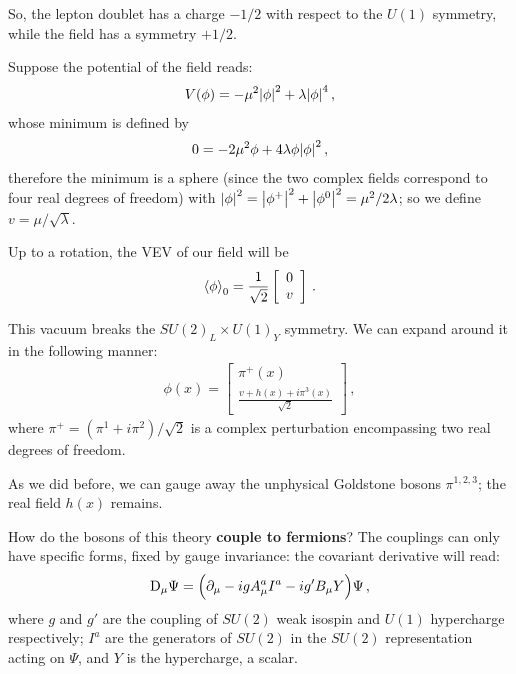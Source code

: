 \documentclass[main.tex]{subfiles}
\begin{document}
So, the lepton doublet has a charge \(-1/2\) with respect to the \(U(1)\) symmetry, while the field has a symmetry \(+1/2\). 

Suppose the potential of the field reads: 
%
\begin{align}
V(\phi ) = - \mu^2 \abs{\phi }^2 + \lambda \abs{\phi }^{4}
\,,
\end{align}
%
whose minimum is defined by 
%
\begin{align}
0= - 2 \mu^2 \phi + 4 \lambda \phi \abs{\phi }^2
\,,
\end{align}
%
therefore the minimum is a sphere (since the two complex fields correspond to four real degrees of freedom) with \(\abs{\phi }^2 =  \abs{\phi^{+}}^2 + \abs{\phi^{0}}^2 = \mu^2 / 2 \lambda \); so we define \(v = \mu / \sqrt{\lambda }\).

Up to a rotation, the VEV of our field will be 
%
\begin{align}
\expval{\phi }_{0} = \frac{1}{\sqrt{2}}
\left[\begin{array}{c}
0 \\ 
v
\end{array}\right]
\,.
\end{align}

This vacuum breaks the \(SU(2)_L \times U(1)_{Y}\) symmetry. 
We can expand around it in the following manner: 
%
\begin{align}
\phi (x) 
= 
\left[\begin{array}{c}
\pi^{+}(x) \\ 
\frac{v + h(x) + i \pi^{3}(x)}{\sqrt{2}}
\end{array}\right]
\,,
\end{align}
%
where \(\pi^{+} = (\pi^{1} + i\pi^{2}) / \sqrt{2}\) is a complex perturbation encompassing two real degrees of freedom. 

As we did before, we can gauge away the unphysical Goldstone bosons \(\pi^{1, 2, 3}\); the real field \(h(x)\) remains. 

How do the bosons of this theory \textbf{couple to fermions}? The couplings can only have specific forms, fixed by gauge invariance: the covariant derivative will read: 
%
\begin{align}
\mathrm{D}_{\mu } \Psi  = 
\qty(\partial_{\mu } 
- i g A^{a}_{\mu } I^{a} 
- i g' B_{\mu } Y
)\Psi 
\,,
\end{align}
%
where \(g\) and \(g'\) are the coupling of \(SU(2)\) weak isospin and \(U(1)\) hypercharge respectively; \(I^{a}\) are the generators of \(SU(2)\) in the \(SU(2)\) representation acting on \(\Psi \), and \(Y\) is the hypercharge, a scalar. 
\end{document}
